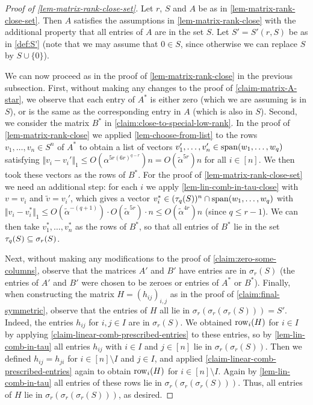 \documentclass{daj}
\theoremstyle{plain}
\theoremstyle{plain}
\theoremstyle{plain}
\theoremstyle{plain}
\theoremstyle{definition}
\theoremstyle{plain}
\theoremstyle{plain}
\theoremstyle{definition}
\theoremstyle{definition}
\theoremstyle{plain}
\begin{document}
\begin{proof}
[Proof of \cref{lem-matrix-rank-close-set}]
Let $r$, $S$ and $A$ be as in \cref{lem-matrix-rank-close-set}. Then $A$ satisfies the assumptions in \cref{lem-matrix-rank-close} with the additional property that all entries of $A$ are in the set $S$. Let $S'=S'(r,S)$ be as in \cref{def:S'} (note that we may assume that $0\in S$, since otherwise we can replace $S$ by $S\cup \lbrace 0\rbrace$).

We can now proceed as in the proof of \cref{lem-matrix-rank-close} in the previous subsection. First, without making any changes to the proof of \cref{claim-matrix-A-star}, we observe that each entry of $A^*$ is either zero (which we are assuming is in $S$), or is the same as the corresponding entry in $A$ (which is also in $S$). Second, we consider the matrix $B^*$ in \cref{claim:close-to-special-low-rank}. In the proof of \cref{lem-matrix-rank-close} we applied \cref{lem-choose-from-list} to the rows $v_1,\dots,v_n\in S^n$ of $A^*$ to obtain a list of vectors $v_1',\dots,v_n'\in \operatorname{span}(w_1,\dots,w_q)$ satisfying $\Vert v_i-v_i'\Vert_1\le O(\alpha^{5r(6r)^{q-r}})n=O(\tilde{\alpha}^{5r})n$ for all $i\in [n]$. We then took these vectors as the rows of $B^*$. For the proof of \cref{lem-matrix-rank-close-set} we need an additional step: for each $i$ we apply \cref{lem-lin-comb-in-tau-close} with $v=v_i$ and $\tilde v=v_i'$, which gives a vector $v_i^*\in (\tau_{q}(S))^n\cap\operatorname{span}(w_1,\dots,w_q)$ with $\Vert v_i-v_i^*\Vert_1\leq O(\tilde\alpha^{-(q+1)})\cdot O(\tilde{\alpha}^{5r}) \cdot n\leq O(\tilde{\alpha}^{4r})n$ (since $q\leq r-1$). We can then take $v_1^*,\dots,v_n^*$ as the rows of $B^*$, so that all entries of $B^*$ lie in the set $\tau_{q}(S)\subseteq \sigma_r(S)$.

Next, without making any modifications to the proof of \cref{claim:zero-some-columns}, observe that the matrices $A'$ and $B'$ have entries are in $\sigma_{r}(S)$ (the entries of $A'$ and $B'$ were chosen to be zeroes or entries of $A^*$ or $B^*$). Finally, when constructing the matrix $H=(h_{ij})_{i,j}$ as in the proof of \cref{claim:final-symmetric}, observe that the entries of $H$ all lie in $\sigma_r(\sigma_r(\sigma_r(S)))=S'$. Indeed, the entries $h_{ij}$ for $i,j\in I$ are in $\sigma_{r}(S)$. We obtained $\operatorname{row}_i(H)$ for $i\in I$ by applying \cref{claim-linear-comb-prescribed-entries} to these entries, so by \cref{lem-lin-comb-in-tau} all entries $h_{ij}$ with $i\in I$ and $j\in [n]$ lie in $\sigma_r(\sigma_r(S))$. Then we defined $h_{ij}=h_{ji}$ for $i\in [n]\setminus I$ and $j\in I$, and applied \cref{claim-linear-comb-prescribed-entries} again to obtain $\operatorname{row}_i(H)$ for $i\in [n]\setminus I$. Again by \cref{lem-lin-comb-in-tau} all entries of these rows lie in $\sigma_r(\sigma_r(\sigma_r(S)))$. Thus, all entries of $H$ lie in $\sigma_r(\sigma_r(\sigma_r(S)))$, as desired.
\end{proof}
\end{document}
